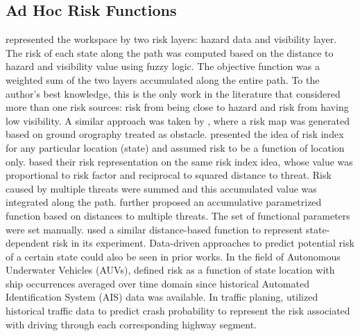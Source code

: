 \documentclass[letterpaper]{article} %
\begin{document}
\subsection{Ad Hoc Risk Functions}
\citeauthor{soltani2004fuzzy} represented the workspace by two risk layers: hazard data and visibility layer. The risk of each state along the path was computed based on the distance to hazard and visibility value using fuzzy logic. The objective function was a weighted sum of the two layers accumulated along the entire path. To the author's best knowledge, this is the only work in the literature that considered more than one risk sources: risk from being close to hazard and risk from having low visibility. A similar approach was taken by \citeauthor{de2011minimum}, where a risk map was generated based on ground orography treated as obstacle. \citeauthor{vian1989trajectory} presented the idea of risk index for any particular location (state) and assumed risk to be a function of location only. \citeauthor{zabarankin2002optimal} based their risk representation on the same risk index idea, whose value was proportional to risk factor and reciprocal to squared distance to threat. Risk caused by multiple threats were summed and this accumulated value was integrated along the path. \citeauthor{gu2006comprehensive} further proposed an accumulative parametrized function based on distances to multiple threats. The set of functional parameters were set manually. \citeauthor{feyzabadi2014risk} used a similar distance-based function to represent state-dependent risk in its experiment. Data-driven approaches to predict potential risk of a certain state could also be seen in prior works. In the field of Autonomous Underwater Vehicles (AUVs), \citeauthor{pereira2011toward} defined risk as a function of state location with ship occurrences averaged over time domain since historical Automated Identification System (AIS) data was available. In traffic planing, \citeauthor{krumm2017risk} utilized historical traffic data to predict crash probability to represent the risk associated with driving through each corresponding highway segment. 
\end{document}
